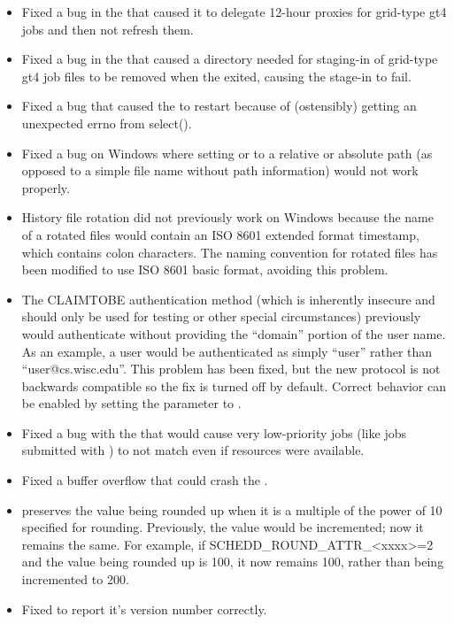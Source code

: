 \begin{itemize}
\item Fixed a bug in the  that caused it to delegate
12-hour proxies for grid-type gt4 jobs and then not refresh them.

\item Fixed a bug in the  that caused a directory
needed for staging-in of grid-type gt4 job files to be removed when
the  exited, causing the stage-in to fail.

\item Fixed a bug that caused the  to restart
because of (ostensibly) getting an unexpected errno from select().

\item Fixed a bug on Windows where setting  or
 to a relative or absolute path (as opposed to a
simple file name without path information) would not work properly.

\item History file rotation did not previously work on Windows because
the name of a rotated files would contain an ISO 8601 extended format
timestamp, which contains colon characters. The naming convention for
rotated files has been modified to use ISO 8601 basic format, avoiding
this problem.

\item The CLAIMTOBE authentication method (which is inherently
insecure and should only be used for testing or other special
circumstances) previously would authenticate without providing the
``domain'' portion of the user name. As an example, a user would be
authenticated as simply ``user'' rather than
``user@cs.wisc.edu''. This problem has been fixed, but the new
protocol is not backwards compatible so the fix is turned off by
default. Correct behavior can be enabled by setting the
 parameter to .

\item Fixed a bug with the  that
would cause very low-priority jobs (like jobs submitted with
) to not match even if resources were available.

\item Fixed a buffer overflow that could crash the .

\item {} preserves the value being
rounded up when it is a multiple of the power of 10 specified for
rounding.  Previously, the value would be incremented; now it remains
the same.  For example, if SCHEDD\_ROUND\_ATTR\_<xxxx>=2 and the value
being rounded up is 100, it now remains 100, rather than being
incremented to 200.

\item Fixed  to report it's version number
correctly.

\end{itemize}

